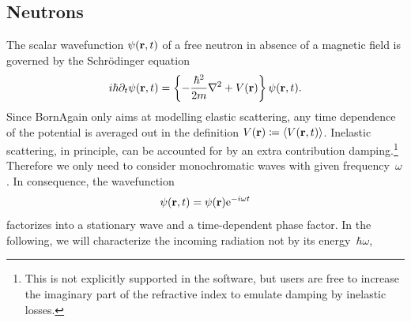 \subsection{Neutrons}\label{SnScalar}
%
%

\def\Vmac{\tilde{V}}

%
The scalar wavefunction $\psi(\mathbf{r},t)$
%
%
%
of a free neutron
in absence of a magnetic field
is governed by the Schrödinger equation
\begin{equation}\label{ESchrodi1}
  i\hbar\partial_t \psi(\mathbf{r},t)
  = \left\{-\frac{\hbar^2}{2m}\mathbf{\nabla}^2+V(\mathbf{r})\right\} \psi(\mathbf{r},t).
\end{equation}
Since BornAgain only aims at modelling elastic scattering,
%
any time dependence of the potential is averaged out in the definition
%
%
$V(\mathbf{r})\coloneqq \langle V(\mathbf{r},t)\rangle$.
%
%
Inelastic scattering,
%
%
%
%
in principle, can be accounted for by an extra contribution
damping.\footnote
{This is not explicitly supported in the software,
but users are free to increase the imaginary part of the refractive index
%
to emulate damping by inelastic losses.\label{Flosses}}
Therefore we only need to consider monochromatic waves
%
%
with given frequency~$\omega$.
%
In consequence, the wavefunction
\begin{equation}\label{Estationarywave}
  \psi(\mathbf{r},t) = \psi(\mathbf{r})\mathrm e^{-i\omega t}
\end{equation}
%
factorizes into a stationary wave and a time-dependent phase factor.
%
%
In the following, we will characterize the incoming radiation
not by its energy~$\hbar\omega$,
